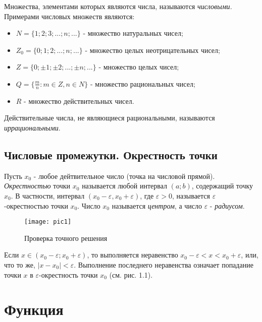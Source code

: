 \documentclass[14pt]{extreport}
\begin{document}
Множества, элементами которых являются числа, называются \emph{числовыми}. Примерами числовых множеств являются:
\begin{itemize}
\item $N = \{1; 2; 3; ...; n; ...\}$ - множество натуральных чисел;
\item $Z_0 = \{0; 1; 2; ...; n; ...\}$ - множество целых неотрицательных чисел;
\item $Z = \{0; \pm 1; \pm 2; ...; \pm n; ...\}$ - множество целых чисел;
\item $Q = \{\frac mn : m \in Z, n \in N\}$ - множество рациональных чисел;
\item $R$ - множество действительных чисел.
\end{itemize} 

Действительные числа, не являющиеся рациональными, называются \emph{иррациональными}.



\section{Числовые промежутки. Окрестность точки}
\begin{example}
Пусть $x_0$ - любое дейтвительное число (точка на числовой прямой). \emph{Окрестностью} точки $x_0$ называется любой интервал $(a; b)$, содержащий точку $x_0$. В частности, интервал $(x_0 - \varepsilon, x_0 + \varepsilon)$, где $\varepsilon > 0$, называется $\varepsilon$-окрестностью точки $x_0$. Число $x_0$ называется \emph{центром}, а число $\varepsilon$ - \emph{радиусом}.

\begin{figure}[H]
\centerline{\texttt{[image: pic1]}}
\caption{Проверка точного решения}
\label{fig11}
\end{figure}

Если $x \in (x_0 - \varepsilon; x_0 + \varepsilon)$, то выполняется неравенство $x_0 - \varepsilon < x < x_0 + \varepsilon$, или, что то же, $|x - x_0| < \varepsilon$. Выполнение последнего неравенства означает попадание точки $x$ в $\varepsilon$-окрестность точки $x_0$ (см. рис. 1.1).
\end{example}





\chapter{Функция}
\end{document}
